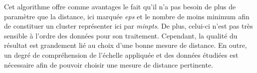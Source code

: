 \documentclass[memoire.tex]{subfiles}
\begin{document}
Cet algorithme offre comme avantages le fait qu'il n'a pas besoin de plus de paramètre que la distance, ici marquée \textit{eps} et le nombre de moins minimum afin de constituer un cluster représenter ici par \textit{minpts}. De plus, celui-ci n'est pas très sensible à l'ordre des données pour son traitement. Cependant, la qualité du résultat est grandement lié au choix d'une bonne mesure de distance. En outre, un degré de compréhension de l'échelle appliquée et des données étudiées est nécessaire afin de pouvoir choisir une mesure de distance pertinente.
\end{document}
